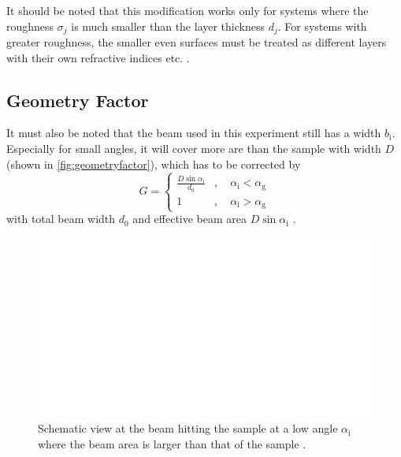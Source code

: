 It should be noted that this modification works only for systems where the roughness $\sigma_j$ is much smaller than the layer thickness $d_j$.
For systems with greater roughness, the smaller even surfaces must be treated as different layers with their own refractive indices etc. \cite{tolan}.

\subsection{Geometry Factor}

It must also be noted that the beam used in this experiment still has a width $b_\text{i}$.
Especially for small angles, it will cover more are than the sample with width $D$ (shown in \autoref{fig:geometryfactor}), 
which has to be corrected by
\begin{equation}
    G = \begin{cases}
        \frac{D \sin\alpha_\text{i}}{d_0}&, \quad \alpha_ \text{i} < \alpha_\text{g} \\
        1&,\quad \alpha_\text{i} > \alpha_\text{g}
    \end{cases}
    \label{eq:GeometryFactor}
\end{equation}
with total beam width $d_0$ and effective beam area $D \sin\alpha_\text{i}$ \cite{v44}.

\begin{figure}[H]
    \centering
    \includegraphics{figures/beam_width.pdf}
    \caption{Schematic view at the beam hitting the sample at a low angle $\alpha_\text{i}$ where the beam area is larger than that of the sample \cite{v44}.}
    \label{fig:geometryfactor}
\end{figure}




